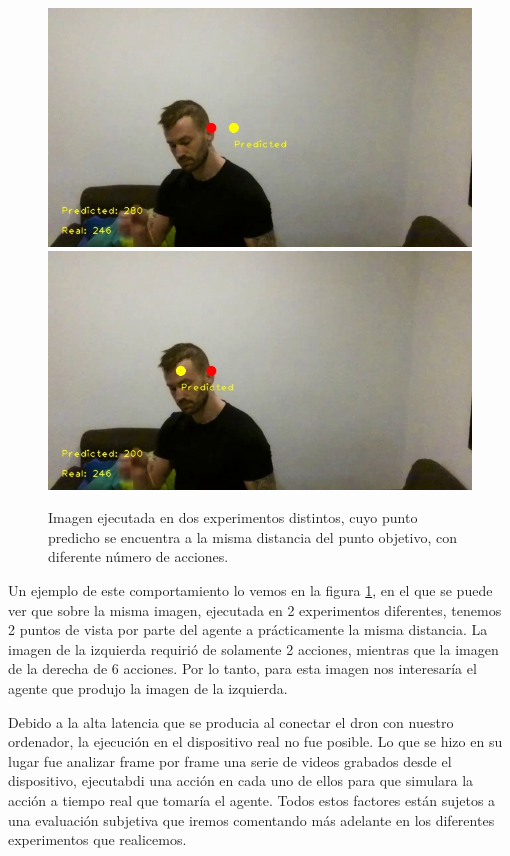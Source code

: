 \begin{figure}[ht!]
	\centering
	\includegraphics[scale=0.3]{figuras/recompensa/comparacion_2_acciones_tomadas.jpg}
	\includegraphics[scale=0.3]{figuras/recompensa/comparacion_6_acciones_tomadas.jpg}
	\caption[Imagen ejecutada en dos experimentos distintos, a la misma distancia del punto objetivo, con diferente número de acciones.]{Imagen ejecutada en dos experimentos distintos, cuyo punto predicho se encuentra a la misma distancia del punto objetivo, con diferente número de acciones.}%
	\label{fig-comparacion-numero de acciones}
\end{figure}

Un ejemplo de este comportamiento lo vemos en la figura \ref{fig-comparacion-numero de acciones}, en el que se puede ver que sobre la misma imagen, ejecutada en 2 experimentos diferentes, tenemos 2 puntos de vista por parte del agente a prácticamente la misma distancia. La imagen de la izquierda requirió de solamente 2 acciones, mientras que la imagen de la derecha de 6 acciones. Por lo tanto, para esta imagen nos interesaría el agente que produjo la imagen de la izquierda.
\medskip

Debido a la alta latencia que se producia al conectar el dron con nuestro ordenador, la ejecución en el dispositivo real no fue posible. Lo que se hizo en su lugar fue analizar frame por frame una serie de videos grabados desde el dispositivo, ejecutabdi una acción en cada uno de ellos para que simulara la acción a tiempo real que tomaría el agente.
Todos estos factores están sujetos a una evaluación subjetiva que iremos comentando más adelante en los diferentes experimentos que realicemos.